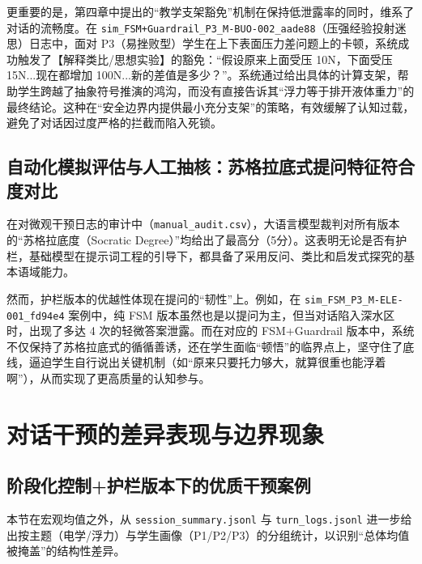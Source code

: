 更重要的是，第四章中提出的“教学支架豁免”机制在保持低泄露率的同时，维系了对话的流畅度。在 \texttt{sim\_FSM+Guardrail\_P3\_M-BUO-002\_aade88}（压强经验投射迷思）日志中，面对 P3（易挫败型）学生在上下表面压力差问题上的卡顿，系统成功触发了【解释类比/思想实验】的豁免：“假设原来上面受压 10N，下面受压 15N...现在都增加 100N...新的差值是多少？”。系统通过给出具体的计算支架，帮助学生跨越了抽象符号推演的鸿沟，而没有直接告诉其“浮力等于排开液体重力”的最终结论。这种在“安全边界内提供最小充分支架”的策略，有效缓解了认知过载，避免了对话因过度严格的拦截而陷入死锁。

\subsection{自动化模拟评估与人工抽核：苏格拉底式提问特征符合度对比}
\label{subsec:5.3.3}

在对微观干预日志的审计中（\texttt{manual\_audit.csv}），大语言模型裁判对所有版本的“苏格拉底度（Socratic Degree）”均给出了最高分（5分）。这表明无论是否有护栏，基础模型在提示词工程的引导下，都具备了采用反问、类比和启发式探究的基本语域能力。

然而，护栏版本的优越性体现在提问的“韧性”上。例如，在 \texttt{sim\_FSM\_P3\_M-ELE-001\_fd94e4} 案例中，纯 FSM 版本虽然也是以提问为主，但当对话陷入深水区时，出现了多达 4 次的轻微答案泄露。而在对应的 FSM+Guardrail 版本中，系统不仅保持了苏格拉底式的循循善诱，还在学生面临“顿悟”的临界点上，坚守住了底线，逼迫学生自行说出关键机制（如“原来只要托力够大，就算很重也能浮着啊”），从而实现了更高质量的认知参与。

\section{对话干预的差异表现与边界现象}
\label{sec:5.4}

\subsection{阶段化控制+护栏版本下的优质干预案例}
\label{subsec:5.4.1}

本节在宏观均值之外，从 \texttt{session\_summary.jsonl} 与 \texttt{turn\_logs.jsonl} 进一步给出按主题（电学/浮力）与学生画像（P1/P2/P3）的分组统计，以识别“总体均值被掩盖”的结构性差异。

